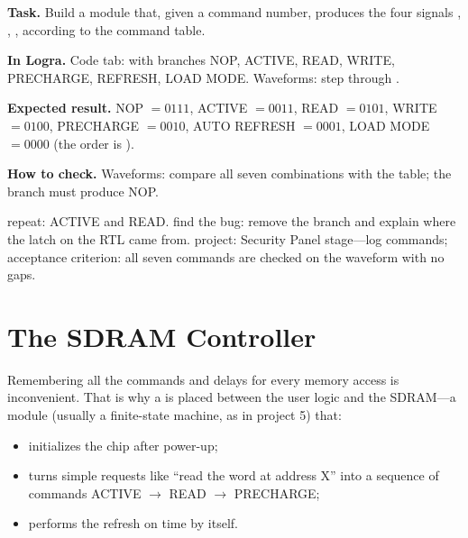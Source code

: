 \begin{diybox}
\textbf{Task.} Build a module that, given a command number, produces the four signals , , ,  according to the command table.

\textbf{In Logra.} Code tab:  with branches NOP, ACTIVE, READ, WRITE, PRECHARGE, REFRESH, LOAD MODE. Waveforms: step through .

\textbf{Expected result.} NOP $=0111$, ACTIVE $=0011$, READ $=0101$, WRITE $=0100$, PRECHARGE $=0010$, AUTO REFRESH $=0001$, LOAD MODE $=0000$ (the order is ).

\textbf{How to check.} Waveforms: compare all seven combinations with the table; the  branch must produce NOP.

 repeat: ACTIVE and READ.  find the bug: remove the  branch and explain where the latch on the RTL came from.  project: Security Panel stage---log commands; acceptance criterion: all seven commands are checked on the waveform with no gaps.
\end{diybox}

\section{The SDRAM Controller}

Remembering all the commands and delays for every memory access is
inconvenient. That is why a  is placed between the user logic
and the SDRAM---a module (usually a finite-state machine, as in project 5) that:
\begin{itemize}
  \item initializes the chip after power-up;
  \item turns simple requests like ``read the word at address X'' into a
        sequence of commands ACTIVE $\to$ READ $\to$ PRECHARGE;
  \item performs the refresh on time by itself.
\end{itemize}

